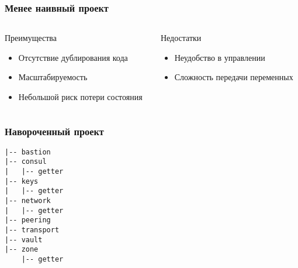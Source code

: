\documentclass[mathserif,serif]{beamer}
\begin{document}
\begin{frame}
	\frametitle{Менее наивный проект}
	\begin{columns}[T]
		\begin{column}{.5\linewidth}
			\begin{minipage}[c][\textheight][c]{\linewidth}
          			Преимущества
				\begin{itemize}
					\item{Отсутствие дублирования кода}
					\item{Масштабируемость}
					\item{Небольшой риск потери состояния}
				\end{itemize}
			\end{minipage}
		\end{column}
		\begin{column}{.5\linewidth}
			\begin{minipage}[c][\textheight][c]{\linewidth}
          			Недостатки
				\begin{itemize}
					\item{Неудобство в управлении}
					\item{Сложность передачи переменных}
				\end{itemize}
			\end{minipage}
		\end{column}
	\end{columns}
\end{frame}

\begin{frame}[fragile]
	\frametitle{Навороченный проект}
	\begin{verbatim}
|-- bastion
|-- consul
|   |-- getter
|-- keys
|   |-- getter
|-- network
|   |-- getter
|-- peering
|-- transport
|-- vault
|-- zone
    |-- getter
	\end{verbatim}
\end{frame}
\end{document}
